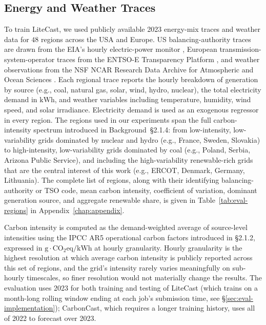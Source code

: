 \subsection{Energy and Weather Traces}
\label{sec:eval-data}

To train LiteCast, we used publicly available 2023 energy-mix traces and weather data for $48$ regions across the USA and Europe.
US balancing-authority traces are drawn from the EIA's hourly electric-power monitor \cite{eia_data}, European transmission-system-operator traces from the ENTSO-E Transparency Platform \cite{entsoe_data}, and weather observations from the NSF NCAR Research Data Archive for Atmospheric and Ocean Sciences \cite{ncep_gfs_2015}.
Each regional trace reports the hourly breakdown of generation by source (e.g., coal, natural gas, solar, wind, hydro, nuclear), the total electricity demand in $\text{kWh}$, and weather variables including temperature, humidity, wind speed, and solar irradiance.
Electricity demand is used as an exogenous regressor in every region.
The regions used in our experiments span the full carbon-intensity spectrum introduced in Background~\S2.1.4: from low-intensity, low-variability grids dominated by nuclear and hydro (e.g., France, Sweden, Slovakia) to high-intensity, low-variability grids dominated by coal (e.g., Poland, Serbia, Arizona Public Service), and including the high-variability renewable-rich grids that are the central interest of this work (e.g., ERCOT, Denmark, Germany, Lithuania).
The complete list of regions, along with their identifying balancing-authority or TSO code, mean carbon intensity, coefficient of variation, dominant generation source, and aggregate renewable share, is given in Table~\ref{tab:eval-regions} in Appendix~\ref{chap:appendix}.

Carbon intensity is computed as the demand-weighted average of source-level intensities using the IPCC AR5 operational carbon factors \cite{ipcc_carbon_factors_2014} introduced in \S2.1.2, expressed in $\text{g}\cdot\text{CO}_2\text{eq}/\text{kWh}$ at hourly granularity.
Hourly granularity is the highest resolution at which average carbon intensity is publicly reported across this set of regions, and the grid's intensity rarely varies meaningfully on sub-hourly timescales, so finer resolution would not materially change the results.
The evaluation uses 2023 for both training and testing of LiteCast (which trains on a month-long rolling window ending at each job's submission time, see \S\ref{sec:eval-implementation}); CarbonCast, which requires a longer training history, uses all of 2022 to forecast over 2023.

